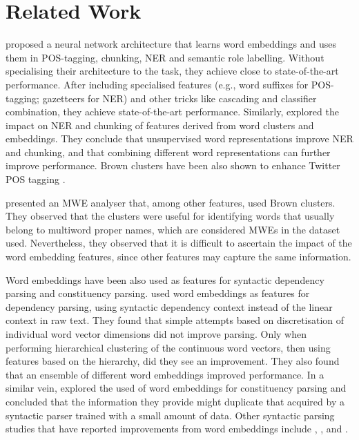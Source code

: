 \section{Related Work}

 proposed a neural network architecture
that learns word embeddings and uses them in POS-tagging, chunking, NER and semantic role labelling. 
Without specialising their architecture to the task, they achieve close
to state-of-the-art performance. After including specialised features
(e.g., word suffixes for POS-tagging;  gazetteers for NER) and other
tricks like cascading and classifier combination, they achieve state-of-the-art performance.
Similarly,  explored the impact on NER and chunking 
of %
features derived from word clusters and embeddings. 
They conclude that unsupervised word representations improve NER and chunking, and that combining different word representations can further improve performance.
Brown clusters have been also shown to enhance Twitter POS tagging
\cite{owoputi2013improved}.

 presented an MWE analyser that, among other features, used Brown clusters. 
They observed that the clusters were useful for identifying words that
usually belong to multiword proper names, which are considered MWEs in
the dataset used.
Nevertheless, they observed that it is difficult to ascertain the impact of the word embedding features, since other features may capture the same information. 

Word embeddings have been also used as features for syntactic dependency parsing and constituency parsing. 
 used word embeddings as features for dependency parsing, using syntactic dependency context instead of the linear context in raw text. They found that simple attempts based on discretisation of individual word vector dimensions did not improve parsing. Only when performing hierarchical clustering of the continuous word vectors, then using features based on the hierarchy, did they see an improvement. They also found that an ensemble of different word embeddings improved performance.
In a similar vein,  explored the used of word embeddings for constituency parsing and concluded that the
information they provide might duplicate that acquired by a
syntactic parser trained with a small amount of data.
Other syntactic parsing studies that have reported improvements from
word embeddings include , ,
 and .

